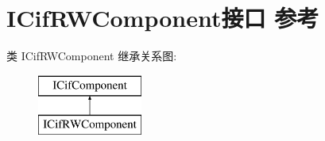 \hypertarget{interface_i_cif_r_w_component}{}\section{I\+Cif\+R\+W\+Component接口 参考}
\label{interface_i_cif_r_w_component}
类 I\+Cif\+R\+W\+Component 继承关系图\+:\begin{figure}[H]
\begin{center}
\leavevmode
\includegraphics[height=2.000000cm]{interface_i_cif_r_w_component}
\end{center}
\end{figure}
